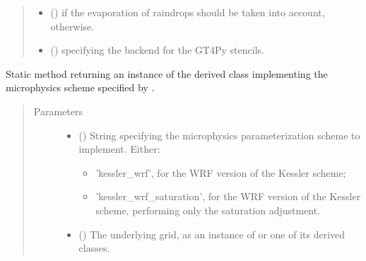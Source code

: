 \documentclass[letterpaper,10pt,english]{sphinxmanual}
\begin{document}
\begin{fulllineitems}
\begin{fulllineitems}
\begin{quote}
\begin{description}
\begin{itemize}
\item {} 
 () \textendash{}  if the evaporation of raindrops should be taken into account,  otherwise.

\item {} 
 () \textendash{}  specifying the backend for the GT4Py stencils.

\end{itemize}

\end{description}\end{quote}

\end{fulllineitems}


\begin{fulllineitems}
\label{\detokenize{api:tasmania.parameterizations.adjustments.AdjustmentMicrophysics.factory}}
Static method returning an instance of the derived class implementing the microphysics scheme
specified by .
\begin{quote}\begin{description}
\item[{Parameters}] \leavevmode\begin{itemize}
\item {} 
 () \textendash{} 
String specifying the microphysics parameterization scheme to implement. Either:
\begin{itemize}
\item {} 
’kessler\_wrf’, for the WRF version of the Kessler scheme;

\item {} 
’kessler\_wrf\_saturation’, for the WRF version of the Kessler scheme, performing only                          the saturation adjustment.

\end{itemize}


\item {} 
 () \textendash{} The underlying grid, as an instance of {\hyperref[\detokenize{api:tasmania.grids.grid_xyz.GridXYZ}]{}} or one of its derived classes.


\end{itemize}
\end{description}
\end{quote}
\end{fulllineitems}
\end{fulllineitems}
\end{document}
